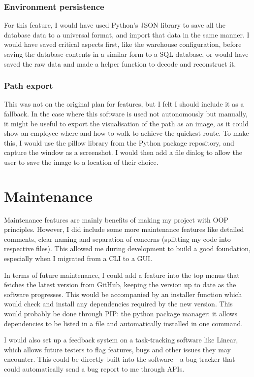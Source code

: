 \subsubsection{Environment persistence}

For this feature, I would have used Python's JSON library to save all the database data to a universal format, and import that data in the same manner. I would have saved critical aspects first, like the warehouse configuration, before saving the database contents in a similar form to a SQL database, or would have saved the raw data and made a helper function to decode and reconstruct it.

\subsubsection{Path export}

This was not on the original plan for features, but I felt I should include it as a fallback. In the case where this software is used not autonomously but manually, it might be useful to export the visualisation of the path as an image, as it could show an employee where and how to walk to achieve the quickest route. To make this, I would use the pillow library from the Python package repository, and capture the window as a screenshot. I would then add a file dialog to allow the user to save the image to a location of their choice.

\section{Maintenance}

Maintenance features are mainly benefits of making my project with OOP principles. However, I did include some more maintenance features like detailed comments, clear naming and separation of concerns (splitting my code into respective files). This allowed me during development to build a good foundation, especially when I migrated from a CLI to a GUI. 

In terms of future maintenance, I could add a feature into the top menus that fetches the latest version from GitHub, keeping the version up to date as the software progresses. This would be accompanied by an installer function which would check and install any dependencies required by the new version. This would probably be done through PIP: the python package manager: it allows dependencies to be listed in a file and automatically installed in one command.

I would also set up a feedback system on a task-tracking software like Linear, which allows future testers to flag features, bugs and other issues they may encounter. This could be directly built into the software - a bug tracker that could automatically send a bug report to me through APIs.